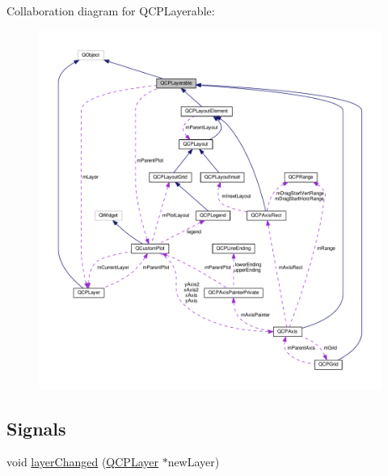 Collaboration diagram for Q\+C\+P\+Layerable\+:
\nopagebreak
\begin{figure}[H]
\begin{center}
\leavevmode
\includegraphics[width=350pt]{classQCPLayerable__coll__graph}
\end{center}
\end{figure}
\subsection*{Signals}
\begin{DoxyCompactItemize}
\item 
void \hyperlink{classQCPLayerable_abbf8657cedea73ac1c3499b521c90eba}{layer\+Changed} (\hyperlink{classQCPLayer}{Q\+C\+P\+Layer} $\ast$new\+Layer)
\end{DoxyCompactItemize}
